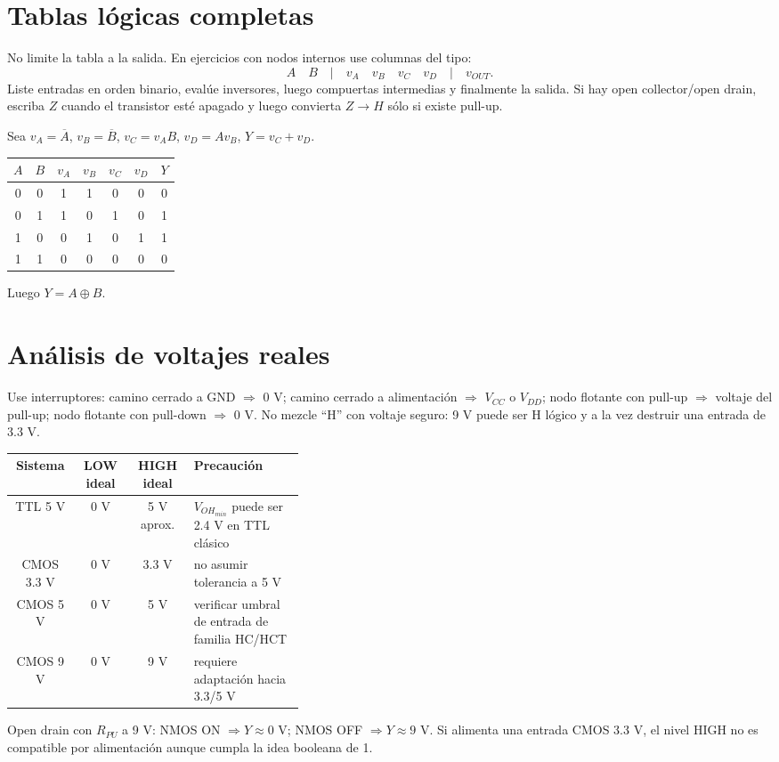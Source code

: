 \documentclass[11pt,letterpaper]{article}
\newcommand{\NOT}[1]{\overline{#1}}\newcommand{\VDD}{V_{DD}}\newcommand{\VCC}{V_{CC}}\newcommand{\VOH}{V_{OH}}\newcommand{\VOL}{V_{OL}}\newcommand{\VIH}{V_{IH}}\newcommand{\VIL}{V_{IL}}
\begin{document}
\section{Tablas lógicas completas}
\begin{procedimiento}No limite la tabla a la salida. En ejercicios con nodos internos use columnas del tipo:
\[A\quad B\quad |\quad v_A\quad v_B\quad v_C\quad v_D\quad |\quad v_{OUT}.
\]
Liste entradas en orden binario, evalúe inversores, luego compuertas intermedias y finalmente la salida. Si hay open collector/open drain, escriba $Z$ cuando el transistor esté apagado y luego convierta $Z\to H$ sólo si existe pull-up.\end{procedimiento}
\begin{ejemplo}
Sea $v_A=\NOT{A}$, $v_B=\NOT{B}$, $v_C=v_AB$, $v_D=Av_B$, $Y=v_C+v_D$.
\begin{center}\begin{tabular}{cc|cccc|c}\toprule
$A$&$B$&$v_A$&$v_B$&$v_C$&$v_D$&$Y$\\\midrule
0&0&1&1&0&0&0\\0&1&1&0&1&0&1\\1&0&0&1&0&1&1\\1&1&0&0&0&0&0\\\bottomrule
\end{tabular}\end{center}
Luego $Y=A\oplus B$.
\end{ejemplo}

\section{Análisis de voltajes reales}
Use interruptores: camino cerrado a GND $\Rightarrow$ 0 V; camino cerrado a alimentación $\Rightarrow$ $V_{CC}$ o $V_{DD}$; nodo flotante con pull-up $\Rightarrow$ voltaje del pull-up; nodo flotante con pull-down $\Rightarrow$ 0 V. No mezcle ``H'' con voltaje seguro: 9 V puede ser H lógico y a la vez destruir una entrada de 3.3 V.
\begin{center}\begin{tabular}{c|c|c|p{0.38\linewidth}}\toprule
Sistema&LOW ideal&HIGH ideal&Precaución\\\midrule
TTL 5 V&0 V&5 V aprox.&$\VOH_{min}$ puede ser 2.4 V en TTL clásico\\
CMOS 3.3 V&0 V&3.3 V&no asumir tolerancia a 5 V\\
CMOS 5 V&0 V&5 V&verificar umbral de entrada de familia HC/HCT\\
CMOS 9 V&0 V&9 V&requiere adaptación hacia 3.3/5 V\\\bottomrule
\end{tabular}\end{center}
\begin{ejemplo}
Open drain con $R_{PU}$ a 9 V: NMOS ON $\Rightarrow Y\approx0$ V; NMOS OFF $\Rightarrow Y\approx9$ V. Si alimenta una entrada CMOS 3.3 V, el nivel HIGH no es compatible por alimentación aunque cumpla la idea booleana de 1.
\end{ejemplo}
\end{document}
